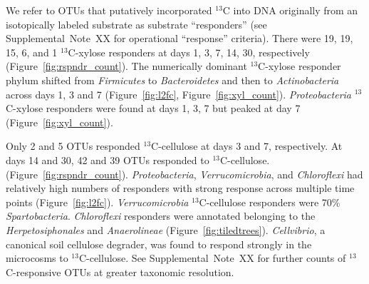 We refer to OTUs that putatively incorporated $^{13}$C into DNA originally from
an isotopically labeled substrate as  substrate ``responders'' (see
Supplemental~Note~XX for operational ``response'' criteria). There were 19, 19,
15, 6, and 1 $^{13}$C-xylose responders at days 1, 3, 7, 14, 30, respectively
(Figure~\ref{fig:rspndr_count}).
The numerically dominant $^{13}$C-xylose responder phylum shifted from
\textit{Firmicutes} to \textit{Bacteroidetes} and then to
\textit{Actinobacteria} across days 1, 3 and 7 (Figure~\ref{fig:l2fc},
Figure~\ref{fig:xyl_count}). \textit{Proteobacteria} $^{13}$C-xylose responders
were found at days 1, 3, 7 but peaked at day 7 (Figure~\ref{fig:xyl_count}). 

Only 2 and 5 OTUs responded $^{13}$C-cellulose at days 3 and 7, respectively.
At days 14 and 30, 42 and 39 OTUs responded to $^{13}$C-cellulose.
(Figure~\ref{fig:rspndr_count}). 
\textit{Proteobacteria}, \textit{Verrucomicrobia}, and \textit{Chloroflexi} had
relatively high numbers of responders with strong response across multiple time
points (Figure~\ref{fig:l2fc}). \textit{Verrucomicrobia} $^{13}$C-cellulose
responders were 70\% \textit{Spartobacteria}. \textit{Chloroflexi} responders
were annotated belonging to the \textit{Herpetosiphonales} and
\textit{Anaerolineae} (Figure~\ref{fig:tiledtrees}). \textit{Cellvibrio},
a canonical soil cellulose degrader, was found to respond strongly in the
microcosms to $^{13}$C-cellulose. See Supplemental~Note~XX for further counts
of $^{13}$C-responsive OTUs at greater taxonomic resolution.

